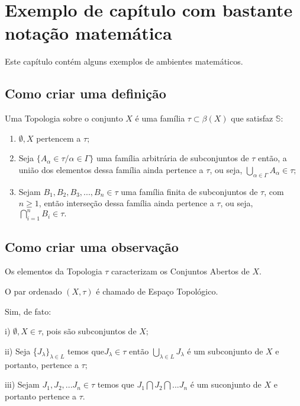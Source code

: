 \chapter[Exemplo de capítulo com bastante notação matemática]{Exemplo de capítulo com bastante notação matemática}

Este capítulo contém alguns exemplos de ambientes matemáticos.

\section{Como criar uma definição}

\begin{defi}
Uma Topologia sobre o conjunto $X$ é uma família $\tau
\subset \beta(X)$ que satisfaz $ \mathbb{S} $:
\begin{enumerate}
 \item$\emptyset,X$ pertencem a $\tau;$
 \item Seja  $\{A_{\alpha} \in \tau /\alpha \in \Gamma\}$
 uma família arbitrária de subconjuntos de  $\tau$ então, a união dos elementos dessa família ainda pertence a  $\tau$, ou seja, $\bigcup \limits_{\alpha \in \Gamma} A_{\alpha}\in\tau;$
 \item Sejam $B_{1},B_{2},B_{3},..., B_{n} \in \tau$ uma família finita de subconjuntos de $\tau$, com $n \geq 1$, então
 interseção dessa família ainda pertence a $\tau$, ou seja, $\bigcap\limits_{i=1}^{n} B_{i}\in \tau.$
\end{enumerate}
\end{defi}

\section{Como criar uma observação}

\begin{obs}

\item Os elementos da Topologia  $\tau$ caracterizam os Conjuntos Abertos de $X.$

\item O par ordenado $(X,\tau)$ é chamado de Espaço Topológico.

Sim, de fato:
\item[i)]$\emptyset, X \in \tau$, pois são subconjuntos de $X;$
\item[ii)]Seja \{$J_{\lambda}\}_{\lambda\in L}$ temos que$J_{\lambda}\in \tau$ então $\bigcup\limits_{\lambda\in L} J_{\lambda}$ é
    um subconjunto de $X$ e portanto, pertence a $\tau;$
\item[iii)] Sejam $J_{1},J_{2},...J_{n} \in \tau$ temos que $J_{1}\bigcap J_{2}\bigcap ...J_{n}$ é um suconjunto de $X$ e portanto pertence a $\tau.$

\end{obs}


